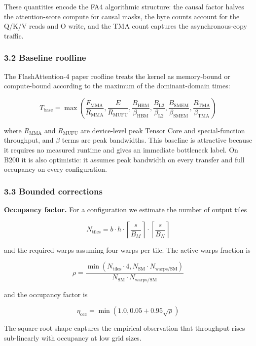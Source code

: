 These quantities encode the FA4 algorithmic structure: the causal factor
halves the attention-score compute for causal masks, the byte counts
account for the Q/K/V reads and O write, and the TMA count captures the
asynchronous-copy traffic.

\subsubsection{3.2 Baseline roofline}\label{baseline-roofline}

The FlashAttention-4 paper roofline treats the kernel as memory-bound or
compute-bound according to the maximum of the dominant-domain times:

\[
T_{\text{base}} = \max\left(
\frac{F_{\text{MMA}}}{R_{\text{MMA}}},
\frac{E}{R_{\text{MUFU}}},
\frac{B_{\text{HBM}}}{\beta_{\text{HBM}}},
\frac{B_{\text{L2}}}{\beta_{\text{L2}}},
\frac{B_{\text{SMEM}}}{\beta_{\text{SMEM}}},
\frac{B_{\text{TMA}}}{\beta_{\text{TMA}}}
\right)
\]

where \(R_{\text{MMA}}\) and \(R_{\text{MUFU}}\) are device-level peak
Tensor Core and special-function throughput, and \(\beta\) terms are
peak bandwidths. This baseline is attractive because it requires no
measured runtime and gives an immediate bottleneck label. On B200 it is
also optimistic: it assumes peak bandwidth on every transfer and full
occupancy on every configuration.

\subsubsection{3.3 Bounded corrections}\label{bounded-corrections}

\textbf{Occupancy factor.} For a configuration we estimate the number of
output tiles

\[
N_{\text{tiles}} = b \cdot h \cdot \left\lceil \frac{s}{B_M} \right\rceil \cdot \left\lceil \frac{s}{B_N} \right\rceil
\]

and the required warps assuming four warps per tile. The active-warps
fraction is

\[
\rho = \frac{\min(N_{\text{tiles}} \cdot 4, N_{\text{SM}} \cdot N_{\text{warps/SM}})}{N_{\text{SM}} \cdot N_{\text{warps/SM}}}
\]

and the occupancy factor is

\[
\eta_{\text{occ}} = \min\left(1.0, 0.05 + 0.95 \sqrt{\rho}\right)
\]

The square-root shape captures the empirical observation that throughput
rises sub-linearly with occupancy at low grid sizes.

